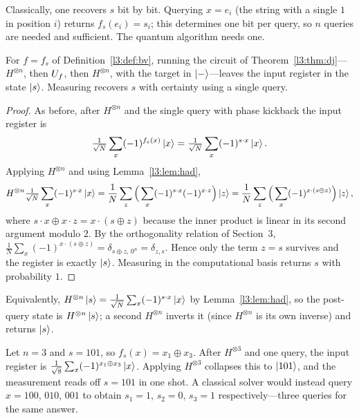 Classically, one recovers $s$ bit by bit. Querying $x=e_i$ (the string with a
single $1$ in position $i$) returns $f_s(e_i)=s_i$; this determines one bit per
query, so $n$ queries are needed and sufficient. The quantum algorithm needs one.

\begin{theorem}
\label{l3:thm:bv}
For $f=f_s$ of Definition~\ref{l3:def:bv}, running the circuit of
Theorem~\ref{l3:thm:dj}---$H^{\otimes n}$, then $U_f$, then $H^{\otimes n}$, with the
target in $\ket{-}$---leaves the input register in the state $\ket{s}$. Measuring
recovers $s$ with certainty using a single query.
\end{theorem}

\begin{proof}
As before, after $H^{\otimes n}$ and the single query with phase kickback the input
register is
\[
  \tfrac{1}{\sqrt N}\sum_{x}(-1)^{f_s(x)}\ket{x}
  =\tfrac{1}{\sqrt N}\sum_{x}(-1)^{s\cdot x}\ket{x}.
\]
Applying $H^{\otimes n}$ and using Lemma~\ref{l3:lem:had},
\[
  H^{\otimes n}\tfrac{1}{\sqrt N}\sum_{x}(-1)^{s\cdot x}\ket{x}
  =\frac{1}{N}\sum_{z}\Big(\sum_{x}(-1)^{s\cdot x}(-1)^{x\cdot z}\Big)\ket{z}
  =\frac{1}{N}\sum_{z}\Big(\sum_{x}(-1)^{x\cdot(s\oplus z)}\Big)\ket{z},
\]
where $s\cdot x\oplus x\cdot z=x\cdot(s\oplus z)$ because the inner product is
linear in its second argument modulo $2$. By the orthogonality relation of
Section~3, $\tfrac{1}{N}\sum_{x}(-1)^{x\cdot(s\oplus z)}=\delta_{s\oplus z,\,0^n}
=\delta_{z,s}$. Hence only the term $z=s$ survives and the register is exactly
$\ket{s}$. Measuring in the computational basis returns $s$ with probability $1$.
\end{proof}

Equivalently, $H^{\otimes n}\ket{s}=\tfrac{1}{\sqrt N}\sum_x(-1)^{s\cdot x}\ket{x}$
by Lemma~\ref{l3:lem:had}, so the post-query state is $H^{\otimes n}\ket{s}$; a second
$H^{\otimes n}$ inverts it (since $H^{\otimes n}$ is its own inverse) and returns
$\ket{s}$.

\begin{example}
\label{l3:ex:bv}
Let $n=3$ and $s=101$, so $f_s(x)=x_1\oplus x_3$. After $H^{\otimes 3}$ and one
query, the input register is $\tfrac{1}{\sqrt8}\sum_{x}(-1)^{x_1\oplus x_3}\ket{x}$.
Applying $H^{\otimes 3}$ collapses this to $\ket{101}$, and the measurement reads
off $s=101$ in one shot. A classical solver would instead query
$x=100$, $010$, $001$ to obtain $s_1=1$, $s_2=0$, $s_3=1$ respectively---three
queries for the same answer.
\end{example}

